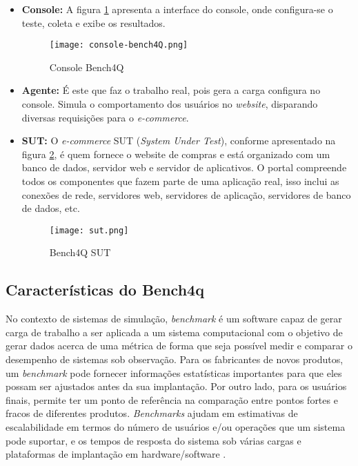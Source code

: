 \begin{itemize}
	
	\item \textbf{Console:} A figura \ref{fig:console-bench4q} apresenta a interface do console, onde configura-se o teste, coleta e exibe os resultados. 
	
	\begin{figure}[htb]
		\caption{Console Bench4Q}
		\label{fig:console-bench4q}
		\centering
		\texttt{[image: console-bench4Q.png]}
	\end{figure}
	
	\item \textbf{Agente:} É este que faz o trabalho real, pois gera a carga configura no console. Simula o comportamento dos usuários no \textit{website}, disparando diversas requisições para o \textit{e-commerce}. 
	
	\item \textbf{SUT:} O \textit{e-commerce} SUT (\textit{System Under Test}), conforme apresentado na figura \ref{fig:sut},  é quem fornece o website de compras e está organizado com um banco de dados, servidor web e servidor de aplicativos. O portal compreende todos os componentes que fazem parte de uma aplicação real, isso inclui as conexões de rede, servidores web, servidores de aplicação, servidores de banco de dados, etc.
	
	\begin{figure}[htb]
		\caption{Bench4Q SUT}
		\label{fig:sut}
		\centering
		\texttt{[image: sut.png]}
	\end{figure}
	
\end{itemize}


\subsection{Características do Bench4q}
\label{cap:caracteristicas-bench4q}
No contexto de sistemas de simulação, \textit{benchmark} é um software capaz de gerar carga de trabalho a ser aplicada a um sistema computacional com o objetivo de gerar dados acerca de uma métrica de forma que seja possível medir e comparar o desempenho de sistemas sob observação. Para os fabricantes de novos produtos, um \textit{benchmark} pode fornecer informações estatísticas importantes para que eles possam ser ajustados antes da sua implantação. Por outro lado, para os usuários finais, permite ter um ponto de referência na comparação entre pontos fortes e fracos de diferentes produtos. \textit{Benchmarks} ajudam em estimativas de escalabilidade em termos do número de usuários e/ou operações que um sistema pode suportar, e os tempos de resposta do sistema sob várias cargas e plataformas de implantação em hardware/software \cite{Jutla1999}.

